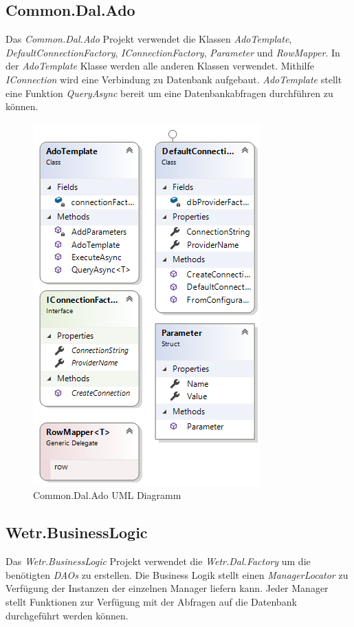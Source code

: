 \newpage
\subsection{Common.Dal.Ado}
Das \textit{Common.Dal.Ado} Projekt verwendet die Klassen \textit{AdoTemplate}, \textit{DefaultConnectionFactory}, \textit{IConnectionFactory}, \textit{Parameter} und  \textit{RowMapper}. In der  \textit{AdoTemplate} Klasse werden alle anderen Klassen verwendet. Mithilfe  \textit{IConnection} wird eine Verbindung zu Datenbank aufgebaut.  \textit{AdoTemplate} stellt eine Funktion  \textit{QueryAsync} bereit um eine Datenbankabfragen durchführen zu können.

\begin{figure}[H]
\centering
\includegraphics[width=.6\textwidth]{pictures/Common_Dal_Ado_ClassDiagramm.png}
\caption{Common.Dal.Ado UML Diagramm}
\label{fig:common.dal.ado}
\end{figure}
\raggedright

\newpage
\subsection{Wetr.BusinessLogic}
Das \textit{Wetr.BusinessLogic} Projekt verwendet die \textit{Wetr.Dal.Factory} um die benötigten \textit{DAOs} zu erstellen. Die Business Logik stellt einen \textit{ManagerLocator} zu Verfügung der Instanzen der einzelnen Manager liefern kann. Jeder Manager stellt Funktionen zur Verfügung mit der Abfragen auf die Datenbank durchgeführt werden können.


